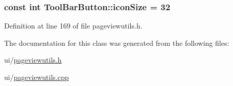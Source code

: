 \hypertarget{classToolBarButton_af20cb74ef4ee4e049fd8bb18619106fa}{
\subsubsection[{icon\+Size}]{\setlength{\rightskip}{0pt plus 5cm}const int Tool\+Bar\+Button\+::icon\+Size = 32\hspace{0.3cm}{\ttfamily [static]}}}\label{classToolBarButton_af20cb74ef4ee4e049fd8bb18619106fa}


Definition at line 169 of file pageviewutils.\+h.



The documentation for this class was generated from the following files\+:\begin{DoxyCompactItemize}
\item 
ui/\hyperlink{pageviewutils_8h}{pageviewutils.\+h}\item 
ui/\hyperlink{pageviewutils_8cpp}{pageviewutils.\+cpp}\end{DoxyCompactItemize}

